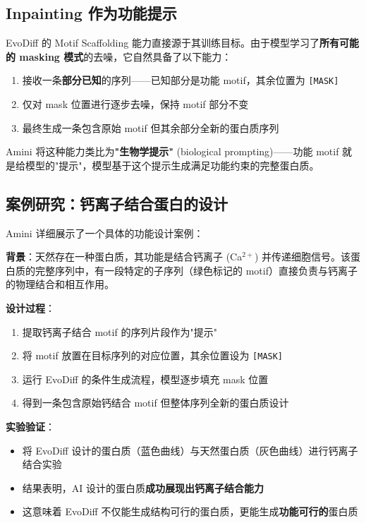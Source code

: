 \documentclass[a4paper]{article}
\begin{document}
\subsection{Inpainting 作为功能提示}

EvoDiff 的 Motif Scaffolding 能力直接源于其训练目标。由于模型学习了\textbf{所有可能的 masking 模式}的去噪，它自然具备了以下能力：

\begin{enumerate}
    \item 接收一条\textbf{部分已知}的序列——已知部分是功能 motif，其余位置为 \texttt{[MASK]}
    \item 仅对 mask 位置进行逐步去噪，保持 motif 部分不变
    \item 最终生成一条包含原始 motif 但其余部分全新的蛋白质序列
\end{enumerate}

Amini 将这种能力类比为\textbf{"生物学提示"} (biological prompting)——功能 motif 就是给模型的"提示"，模型基于这个提示生成满足功能约束的完整蛋白质。

\subsection{案例研究：钙离子结合蛋白的设计}

Amini 详细展示了一个具体的功能设计案例：

\textbf{背景}：天然存在一种蛋白质，其功能是结合钙离子 (Ca$^{2+}$) 并传递细胞信号。该蛋白质的完整序列中，有一段特定的子序列（绿色标记的 motif）直接负责与钙离子的物理结合和相互作用。

\textbf{设计过程}：
\begin{enumerate}
    \item 提取钙离子结合 motif 的序列片段作为"提示"
    \item 将 motif 放置在目标序列的对应位置，其余位置设为 \texttt{[MASK]}
    \item 运行 EvoDiff 的条件生成流程，模型逐步填充 mask 位置
    \item 得到一条包含原始钙结合 motif 但整体序列全新的蛋白质设计
\end{enumerate}

\textbf{实验验证}：
\begin{itemize}
    \item 将 EvoDiff 设计的蛋白质（蓝色曲线）与天然蛋白质（灰色曲线）进行钙离子结合实验
    \item 结果表明，AI 设计的蛋白质\textbf{成功展现出钙离子结合能力}
    \item 这意味着 EvoDiff 不仅能生成结构可行的蛋白质，更能生成\textbf{功能可行的}蛋白质
\end{itemize}
\end{document}
